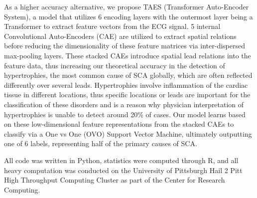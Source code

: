 \documentclass[
	a4paper, 
	10pt, 
	twoside, 
]{LTJournalArticle}
\begin{document}
As a higher accuracy alternative, we propose TAES (Transformer Auto-Encoder System), a model that utilizes 6 encoding layers with the outermost layer being a Transformer to extract feature vectors from the ECG signal. 5 internal Convolutional Auto-Encoders (CAE) are utilized to extract spatial relations before reducing the dimensionality of these feature matrices via inter-dispersed max-pooling layers. These stacked CAEs introduce spatial lead relations into the feature data, thus increasing our theoretical accuracy in the detection of hypertrophies, the most common cause of SCA globally, which are often reflected differently over several leads. Hypertrophies involve inflammation of the cardiac tissue in different locations, thus specific locations or leads are important for the classification of these disorders and is a reason why physician interpretation of hypertrophies is unable to detect around 20\% of cases. Our model learns based on these low-dimensional feature representations from the stacked CAEs to classify via a One vs One (OVO) Support Vector Machine, ultimately outputting one of 6 labels, representing half of the primary causes of SCA. 

 All code was written in Python, statistics were computed through R, and all heavy computation was conducted on the University of Pittsburgh Hail 2 Pitt High Throughput Computing Cluster as part of the Center for Research Computing. 
\end{document}
